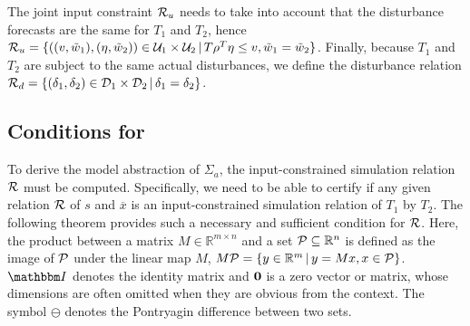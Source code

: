 %
The joint input constraint $\mathcal{R}_{u}$ needs to take into account that the disturbance forecasts are the same for $T_{1}$ and $T_2$, hence $\mathcal{R}_{u} = \{ ((v, \tilde{w}_{1}), (\eta, \tilde{w}_{2})) \in \mathcal{U}_{1} \times \mathcal{U}_{2} \,|\, T \rho^{T} \eta \leq v, \tilde{w}_{1} = \tilde{w}_{2} \}$.
Finally, because $T_{1}$ and $T_{2}$ are subject to the same actual disturbances, we define the disturbance relation $\mathcal{R}_{d} = \{ (\delta_{1}, \delta_{2}) \in \mathcal{D}_{1} \times \mathcal{D}_{2} \,|\, \delta_{1} = \delta_{2} \}$.

\subsection{Conditions for \RSet} %
\label{sec:abstraction-gs:feedback:conditions}

To derive the model abstraction of $\Sigma_{a}$, the input-constrained simulation relation $\mathcal{R}$ must be computed.
Specifically, we need to be able to certify if any given relation $\mathcal{R}$ of $s$ and $\overbar{x}$ is an input-constrained simulation relation of $T_{1}$ by $T_{2}$.
The following theorem provides such a necessary and sufficient condition for $\mathcal{R}$.
Here, the product between a matrix $M \in \mathbb{R}^{m \times n}$ and a set $\mathcal{P} \subseteq \mathbb{R}^{n}$ is defined as the image of $\mathcal{P}$ under the linear map $M$, \ie $M \mathcal{P} = \{ y \in \mathbb{R}^{m} \,|\, y = M x, x \in \mathcal{P}\}$.
$\IdentityMatrix$ denotes the identity matrix and $\mathbf{0}$ is a zero vector or matrix, whose dimensions are often omitted when they are obvious from the context.
The symbol $\ominus$ denotes the Pontryagin difference between two sets.

